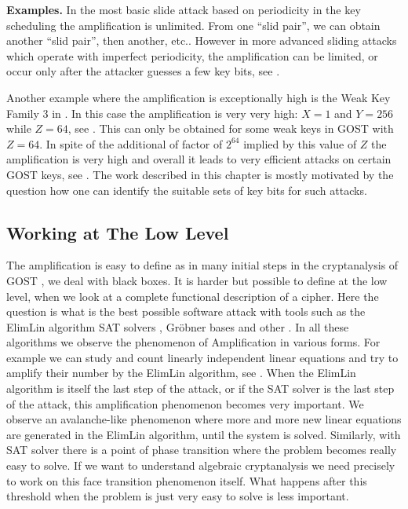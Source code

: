 {\bf Examples.}
In the most basic slide attack based on periodicity
in the key scheduling \cite{slide2}
the amplification is unlimited.
From one ``slid pair'', we can obtain another ``slid pair'',
then another, etc..
However in more advanced sliding attacks which operate with imperfect
periodicity, the amplification can be limited, or occur only after the attacker
guesses a few key bits, see \cite{courtois2008algebraicKeeLoq,KeeLoqTatra}.

Another example where the amplification is exceptionally high is the Weak Key Family 3 in \cite{gostac}.
In this case the amplification is very very high: $X=1$ and $Y=256$
while $Z=64$, see \cite{gostac}.
This can only be obtained for some weak keys in GOST with $Z=64$.
In spite of the additional of factor of $2^{64}$ implied by this value of $Z$
the amplification is very high
and overall it leads to very efficient attacks on certain GOST keys,
see \cite{gostlow8r,gostac}.
The work described in this chapter is mostly motivated
by the question how one can identify
the suitable sets of key bits for such attacks.


\subsection{Working at The Low Level}

The amplification is easy to define as in many initial steps in the cryptanalysis of GOST \cite{gostac}, we deal with black boxes.
It is harder but possible to define at the low level, when we look at a complete functional description of a cipher.
Here the question is what is the best possible software attack with tools such as the ElimLin algorithm \cite{AlgSnowCourtoisDebraize,DEScourtois,ElimLinR} SAT solvers \cite{OptimiPaper,BardCourtoiJeffersonConv}, Gr\"{o}bner bases \cite{grobner} and other \cite{SemaevSparseJournalPaper}. In all these algorithms we observe the phenomenon of Amplification in various forms. For example we can study and count linearly independent linear equations and try to amplify their number
by the ElimLin algorithm, see \cite{AlgSnowCourtoisDebraize,DEScourtois,ElimLinR}.
When the ElimLin algorithm is itself the last step of the attack, or if the SAT solver is the last step of the attack, this amplification phenomenon becomes very important. We observe an avalanche-like phenomenon where more and more new linear equations are generated in the ElimLin algorithm, until the system is solved. Similarly, with SAT solver there is a point of phase transition
where the problem becomes really easy to solve. If we want to understand algebraic cryptanalysis we need precisely to work
on this face transition phenomenon itself. What happens after this threshold when the problem is just very easy to solve
is less important.

